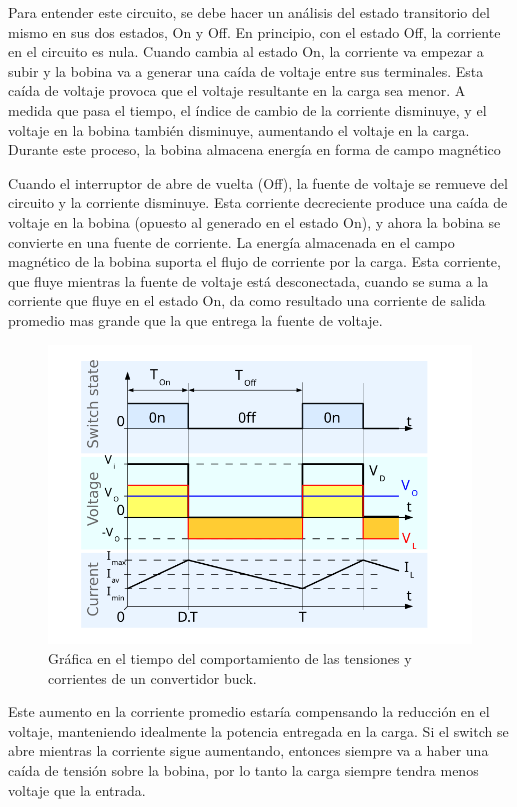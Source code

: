                 Para entender este circuito, se debe hacer un análisis del estado transitorio del mismo en sus dos estados, On y Off. En principio, con el estado Off, la corriente en el circuito es nula. Cuando cambia al estado On, la corriente va empezar a subir y la bobina va a generar una caída de voltaje entre sus terminales. Esta caída de voltaje provoca que el voltaje resultante en la carga sea menor. A medida que pasa el tiempo, el índice de cambio de la corriente disminuye, y el voltaje en la bobina también disminuye, aumentando el voltaje en la carga. Durante este proceso, la bobina almacena energía en forma de campo magnético\par
                Cuando el interruptor de abre de vuelta (Off), la fuente de voltaje se remueve del circuito y la corriente disminuye. Esta corriente decreciente produce una caída de voltaje en la bobina (opuesto al generado en el estado On), y ahora la bobina se convierte en una fuente de corriente. La energía almacenada en el campo magnético de la bobina suporta el flujo de corriente por la carga. Esta corriente, que fluye mientras la fuente de voltaje está desconectada, cuando se suma a la corriente que fluye en el estado On, da como resultado una corriente de salida promedio mas grande que la que entrega la fuente de voltaje.\par

                \begin{figure} [!ht]
                    \centering
                    \includegraphics[width=0.6\linewidth]{MPPT/Gráfica.png}
                    \caption{Gráfica en el tiempo del comportamiento de las tensiones y corrientes de un convertidor buck.}
                    \label{fig:m1.4}
                \end{figure}
                
                Este aumento en la corriente promedio estaría compensando la reducción en el voltaje, manteniendo idealmente la potencia entregada en la carga. Si el switch se abre mientras la corriente sigue aumentando, entonces siempre va a haber una caída de tensión sobre la bobina, por lo tanto la carga siempre tendra menos voltaje que la entrada.\par

